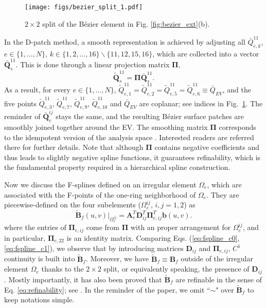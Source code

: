 \documentclass[graybox]{svmult}
\begin{document}
\begin{figure}[htb]
\centering
\texttt{[image: figs/bezier\_split\_1.pdf]}
\caption{$2\times 2$ split of the B\'{e}zier element in Fig. \ref{fig:bezier_ext}(b).}
\label{fig:bezier_split}
\end{figure}

In the D-patch method, a smooth representation is achieved by adjusting all $\bar{Q}_{e,k}^{11}$, $e\in\{1,\ldots,N\}$, $k\in\{1,2,\ldots,16\}\backslash \{11,12,15,16\}$, which are collected into a vector $\bar{\bm{Q}}_{s}^{11}$. This is done through a linear projection matrix $\bm{\Pi}$,
\begin{equation}
\tilde{\bm{Q}}_s^{11} = \bm{\Pi} \bar{\bm{Q}}_s^{11}.
\end{equation}
As a result, for every $e\in\{1,\ldots,N\}$, $\tilde{Q}_{e,1}^{11}=\tilde{Q}_{e,2}^{11}=\tilde{Q}_{e,5}^{11}=\tilde{Q}_{e,6}^{11}\equiv\bar{Q}_{EV}$, and the five points $\tilde{Q}_{e,3}^{11}$, $\tilde{Q}_{e,7}^{11}$, $\tilde{Q}_{e,9}^{11}$, $\tilde{Q}_{e,10}^{11}$ and $\bar{Q}_{EV}$ are coplanar; see indices in Fig.~\ref{fig:bezier_split}. The reminder of $\bar{\bm{Q}}_{e}^{ij}$ stays the same, and the resulting B\'{e}zier surface patches are smoothly joined together around the EV.
The smoothing matrix $\bm{\Pi}$ corresponds to the idempotent version of the analysis space \cite{ref:casquero20, ref:toshniwal17}. Interested readers are referred there for further details. Note that although $\bm{\Pi}$ contains negative coefficients and thus leads to slightly negative spline functions, it guarantees refinability, which is the fundamental property required in a hierarchical spline construction.

Now we discuss the F-splines defined on an irregular element $\Omega_e$, which are associated with the F-points of the one-ring neighborhood of $\Omega_e$. They are piecewise-defined on the four subelements ($\Omega_e^{ij}$, $i,j=1,2$) as
\begin{equation}
\tilde{\bm{B}}_f(u,v)|_{\Omega_e^{ij}} = \bm{A}_e^T \bm{D}_{ij}^T \bm{\Pi}_{e,ij}^T \bm{b}(u,v).
\label{eq:fspline_c1}
\end{equation}
where the entries of $\bm{\Pi}_{e,ij}$ come from $\bm{\Pi}$ with an proper arrangement for $\Omega_e^{ij}$, and in particular, $\bm{\Pi}_{e,22}$ is an identity matrix. Comparing Eqs. (\ref{eq:fspline_c0}, \ref{eq:fspline_c1}), we observe that by introducing matrices $\bm{D}_{ij}$ and $\bm{\Pi}_{e,ij}$, $C^1$ continuity is built into $\tilde{\bm{B}}_f$. Moreover, we have $\tilde{\bm{B}}_f \equiv \bm{B}_f$ outside of the irregular element $\Omega_e$ thanks to the $2\times 2$ split, or equivalently speaking, the presence of $\bm{D}_{ij}$. Mostly importantly, it has also been proved that $\tilde{\bm{B}}_f$ are refinable in the sense of Eq. \eqref{eq:refinability}; see \cite{ref:tnguyen16}. In the reminder of the paper, we omit ``$\sim$" over $\tilde{\bm{B}}_f$ to keep notations simple.
\end{document}
